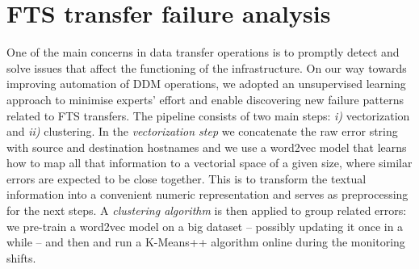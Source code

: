 \chapter{FTS transfer failure analysis} \label{sec:pipeline}


One of the main concerns in data transfer operations is to promptly detect and solve issues that affect the functioning of the infrastructure.
On our way towards improving automation of DDM operations, we adopted an unsupervised learning approach to minimise experts' effort and enable discovering new failure patterns related to FTS transfers. 
The pipeline consists of 
two main steps: \textit{i)} vectorization and \textit{ii)} clustering.
In the {\emph{vectorization step}} we concatenate the raw error string with source and destination hostnames and we use a word2vec model that learns how to map all that information to a vectorial space of a given size, where similar errors are expected to be close together. This is to transform the textual information into a convenient numeric representation and serves as preprocessing for the next steps. 
A {\emph{clustering algorithm}} is then applied to group related errors: 
we pre-train a word2vec model on a big dataset 
-- possibly updating it once in a while -- and then 
and run a \mbox{K-Means++} algorithm \cite{kmeans} online during the monitoring shifts.  
% 

